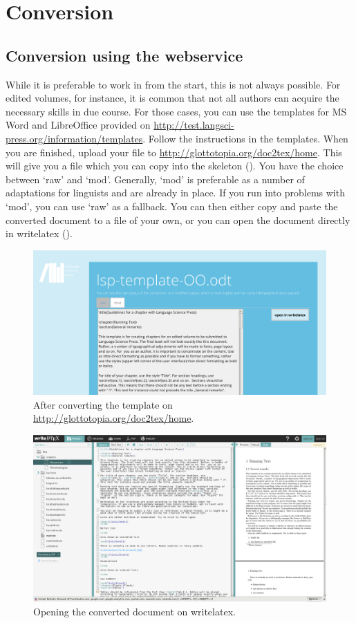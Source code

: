 \chapter{Conversion} 
\section{Conversion using the webservice}
While it is preferable to work in \latex from the start, this is not always possible. For edited volumes, for instance, it is common that not all authors can acquire the necessary skills in due course. For those cases, you can use the templates for MS Word and LibreOffice provided on \url{http://test.langsci-press.org/information/templates}. Follow the instructions in the templates. When you are finished, upload your file to \url{http://glottotopia.org/doc2tex/home}. This will give you a file which you can copy into the skeleton (). You have the choice between `raw' and `mod'. Generally, `mod' is preferable as a number of adaptations for linguists and \lsp are already in place. If you run into problems with `mod', you can use `raw' as a fallback. You can then either copy and paste the converted document to a file of your own, or you can open the document directly in writelatex ().

\begin{figure}
\includegraphics[width=\textwidth]{converter.png} 
\caption{After converting the template on \url{http://glottotopia.org/doc2tex/home}.}
\label{fig:conversion:glottotopia}
\end{figure}

\begin{figure}
\includegraphics[width=\textwidth]{conversionwritelatex.png} 
\caption{Opening the converted document on writelatex.}
\label{fig:conversion:writelatex}
\end{figure}

